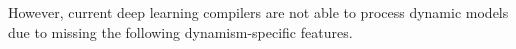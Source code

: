 
However, current deep learning compilers are not able to process dynamic models due to missing the following dynamism-specific features.%

